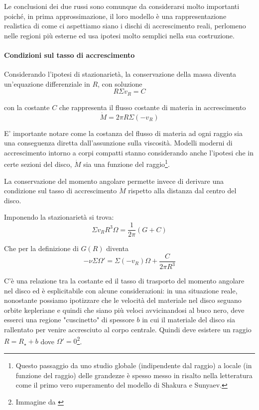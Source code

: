 \documentclass[a4paperbi]{article}
\begin{document}
	Le conclusioni dei due russi sono comunque da considerarsi molto importanti poiché, in prima approssimazione, il loro modello è una rappresentazione realistica di come ci aspettiamo siano i dischi di accrescimento reali, perlomeno nelle regioni più esterne ed usa ipotesi molto semplici nella sua costruzione.
	
	\paragraph{Condizioni sul tasso di accrescimento}
	Considerando l'ipotesi di stazionarietà, la conservazione della massa diventa un'equazione differenziale in $R$, con soluzione
	\begin{equation}
		R\Sigma v_R=C
	\end{equation}
	
	con la costante $C$ che rappresenta il flusso costante di materia in accrescimento
	\begin{equation}
		\dot{M}=2\pi R\Sigma(-v_R)
	\end{equation}
	
	E' importante notare come la costanza del flusso di materia ad ogni raggio sia una conseguenza diretta dall'assunzione sulla viscosità. Modelli moderni di accrescimento intorno a corpi compatti stanno considerando anche l'ipotesi che in certe sezioni del disco, $\dot{M}$ sia una funzione del raggio\footnote{Questo passaggio da uno studio globale (indipendente dal raggio) a locale (in funzione del raggio) delle grandezze è spesso messo in risalto nella letteratura come il primo vero superamento del modello di Shakura e Sunyaev.}.
	
	La conservazione del momento angolare permette invece di derivare una condizione sul tasso di accrescimento $\dot{M}$ rispetto alla distanza dal centro del disco.
	
	Imponendo la stazionarietà si trova:
	\begin{equation}
		\Sigma v_RR^3\Omega=\frac{1}{2\pi}(G+C)
	\end{equation}
	
	Che per la definizione di $G(R)$ diventa
	\begin{equation}
		-\nu\Sigma\Omega'=\Sigma(-v_R)\Omega+\frac{C}{2\pi R^3}
	\end{equation}
	
	C'è una relazione tra la costante ed il tasso di trasporto del momento angolare nel disco ed è esplicitabile con alcune considerazioni: in una situazione reale, nonostante possiamo ipotizzare che le velocità del materiale nel disco seguano orbite kepleriane e quindi che siano più veloci avvicinandosi al buco nero, deve esserci una regione "cuscinetto" di spessore $b$ in cui il materiale del disco sia rallentato per venire accresciuto al corpo centrale. Quindi deve esistere un raggio $R=R_{\star}+b$ dove $\Omega'=0$\footnote{Immagine da \cite{FrankKingRaineAccretionPower}}.
	
\end{document}
